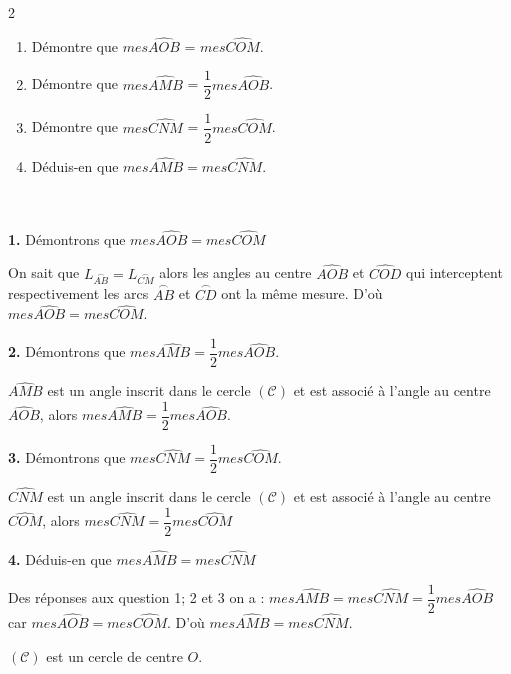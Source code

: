 \begin{multicols*}{2}
\begin{minipage}{5cm}
  		\begin{enumerate}
  			\item  Démontre que $mes\widehat{AOB}$ = $ mes\widehat{COM}$.
  			\item Démontre que $mes\widehat{AMB} $ = $\dfrac{1}{2} mes\widehat{AOB}$.
  			\item Démontre que $mes\widehat{CNM}$ = $\dfrac{1}{2} mes\widehat{COM}$.
  			\item Déduis-en que $mes\widehat{AMB}= mes\widehat{CNM}$.
  		\end{enumerate}
  	\end{minipage}\\ \\
  	\dure 
  	\resul
  	\textbf{1.} Démontrons que $mes\widehat{AOB}= mes\widehat{COM}$
  	
  	On sait que $L_{ \overset{\frown}{AB}}=L_{ \overset{\frown}{CM}}$  alors les angles au centre $\widehat{AOB}$ et $\widehat{COD}$  qui interceptent respectivement les arcs $\overset{\frown}{AB}$ et $\overset{\frown}{CD}$ ont la même mesure. D'où $mes\widehat{AOB}= mes\widehat{COM}$.
  	
  	\textbf{2.} Démontrons que $mes\widehat{AMB} =\dfrac{1}{2} mes\widehat{AOB}$.
  	
  	$\widehat{AMB}$ est un angle inscrit dans le cercle $\mathcal{(C)}$ et est associé à l'angle au centre $\widehat{AOB}$, alors $mes\widehat{AMB}=\dfrac{1}{2} mes\widehat{AOB}$.
  	
  	\textbf{3.}  Démontrons que $mes\widehat{CNM}=\dfrac{1}{2} mes\widehat{COM}$.
  	
  	$\widehat{CNM}$ est un angle inscrit dans le cercle $\mathcal{(C)}$ et est associé à l'angle au centre $\widehat{COM}$, alors $mes\widehat{CNM}=\dfrac{1}{2} mes\widehat{COM}$
  	
  	\textbf{4.} Déduis-en que $mes\widehat{AMB}= mes\widehat{CNM}$
  	
  	Des  réponses aux question 1; 2 et 3  on a : $mes\widehat{AMB}= mes\widehat{CNM}=\dfrac{1}{2} mes\widehat{AOB}$  car $mes\widehat{AOB}= mes\widehat{COM}$. D'où  $mes\widehat{AMB}= mes\widehat{CNM}$.
  	
  	
  	$\mathcal{(C)}$ est un cercle de centre $O$.
  	

\end{multicols*}
